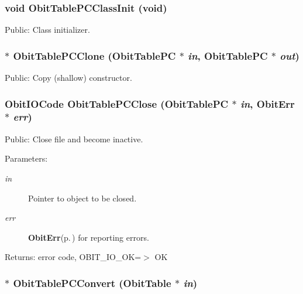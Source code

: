 \subsubsection{\setlength{\rightskip}{0pt plus 5cm}void Obit\-Table\-PCClass\-Init (void)}\label{ObitTablePC_8h_a10}


Public: Class initializer. 

\subsubsection{$\ast$ Obit\-Table\-PCClone ({\bf Obit\-Table\-PC} $\ast$ {\em in}, {\bf Obit\-Table\-PC} $\ast$ {\em out})}\label{ObitTablePC_8h_a15}


Public: Copy (shallow) constructor. 

\subsubsection{\setlength{\rightskip}{0pt plus 5cm}Obit\-IOCode Obit\-Table\-PCClose ({\bf Obit\-Table\-PC} $\ast$ {\em in}, {\bf Obit\-Err} $\ast$ {\em err})}\label{ObitTablePC_8h_a21}


Public: Close file and become inactive. 

\begin{Desc}
\item[Parameters:]
\begin{description}
\item[{\em in}]Pointer to object to be closed. \item[{\em err}]{\bf Obit\-Err}{\rm (p.\,\pageref{structObitErr})} for reporting errors. \end{description}
\end{Desc}
\begin{Desc}
\item[Returns:]error code, OBIT\_\-IO\_\-OK=$>$ OK \end{Desc}
\subsubsection{$\ast$ Obit\-Table\-PCConvert ({\bf Obit\-Table} $\ast$ {\em in})}\label{ObitTablePC_8h_a16}


